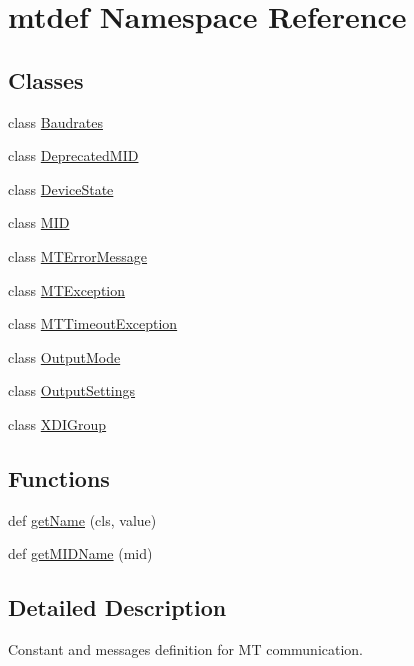 \hypertarget{namespacemtdef}{}\section{mtdef Namespace Reference}
\label{namespacemtdef}
\subsection*{Classes}
\begin{DoxyCompactItemize}
\item 
class \hyperlink{classmtdef_1_1Baudrates}{Baudrates}
\item 
class \hyperlink{classmtdef_1_1DeprecatedMID}{Deprecated\+M\+ID}
\item 
class \hyperlink{classmtdef_1_1DeviceState}{Device\+State}
\item 
class \hyperlink{classmtdef_1_1MID}{M\+ID}
\item 
class \hyperlink{classmtdef_1_1MTErrorMessage}{M\+T\+Error\+Message}
\item 
class \hyperlink{classmtdef_1_1MTException}{M\+T\+Exception}
\item 
class \hyperlink{classmtdef_1_1MTTimeoutException}{M\+T\+Timeout\+Exception}
\item 
class \hyperlink{classmtdef_1_1OutputMode}{Output\+Mode}
\item 
class \hyperlink{classmtdef_1_1OutputSettings}{Output\+Settings}
\item 
class \hyperlink{classmtdef_1_1XDIGroup}{X\+D\+I\+Group}
\end{DoxyCompactItemize}
\subsection*{Functions}
\begin{DoxyCompactItemize}
\item 
def \hyperlink{namespacemtdef_a1c9aa41c94cfc217a0cb9e4ff56a8b7d}{get\+Name} (cls, value)
\item 
def \hyperlink{namespacemtdef_a7443ca835fd211b9840edc390448983c}{get\+M\+I\+D\+Name} (mid)
\end{DoxyCompactItemize}


\subsection{Detailed Description}
\begin{DoxyVerb}Constant and messages definition for MT communication.\end{DoxyVerb}
 

